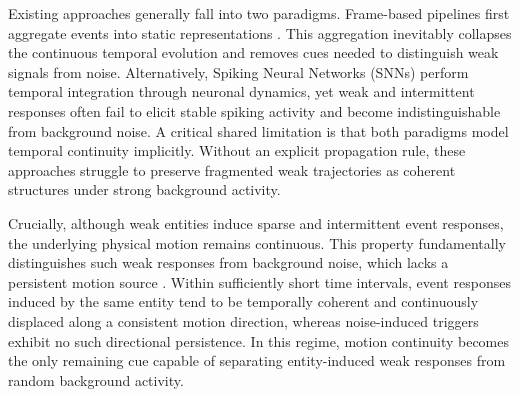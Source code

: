 \documentclass[runningheads]{llncs}
\begin{document}
Existing approaches generally fall into two paradigms.
Frame-based pipelines first aggregate events into static representations \cite{Maqueda2018event, mitrokhin2020learning,yang2022querydet}. 
This aggregation inevitably collapses the continuous temporal evolution and removes cues needed to distinguish weak signals from noise.
Alternatively, Spiking Neural Networks (SNNs) \cite{neftci2019surrogate,su2023deep,luo2024integer,cordone2022object} perform temporal integration through neuronal dynamics, yet weak and intermittent responses often fail to elicit stable spiking activity and become indistinguishable from background noise.
A critical shared limitation is that both paradigms model temporal continuity implicitly. 
Without an explicit propagation rule, these approaches struggle to preserve fragmented weak trajectories as coherent structures under strong background activity.

Crucially, although weak entities induce sparse and intermittent event responses, the underlying physical motion remains continuous.
This property fundamentally distinguishes such weak responses from background noise, which lacks a persistent motion source \cite{gallego2022survey}.
Within sufficiently short time intervals, event responses induced by the same entity tend to be temporally coherent and continuously displaced along a consistent motion direction, whereas noise-induced triggers exhibit no such directional persistence.
In this regime, motion continuity becomes the only remaining cue capable of separating entity-induced weak responses from random background activity.
\end{document}
